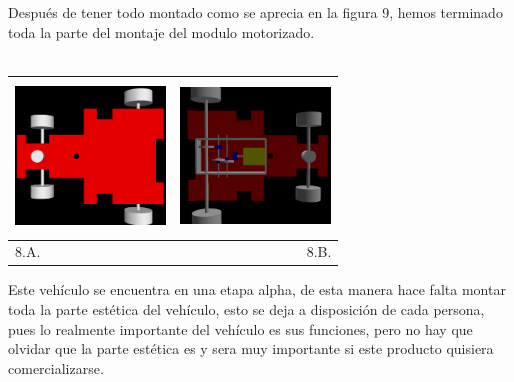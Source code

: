 \documentclass[12]{article}
\newenvironment{Figure}
{\par\medskip\noindent\minipage{\linewidth}}
{\endminipage\par\medskip}
\begin{document}
\begin{multicols}{2}
Después de tener todo montado como se aprecia en la figura 9, hemos terminado toda la parte del montaje del modulo motorizado.\\\\

\begin{Figure}	
\center
\begin{tabular}{|l|r|}
\hline
\includegraphics[width=4cm, height=4cm]{img/montaje1.png} & \includegraphics[width=4cm, height=4cm]{img/montaje2.png} \\ \hline
8.A. & 8.B. \\ \hline
\end{tabular}
\label{fig:g8}
\end{Figure}
\vspace{0.6 cm}

Este vehículo se encuentra en una etapa alpha, de esta manera hace falta montar toda la parte estética del vehículo, esto se deja a disposición de cada persona, pues lo realmente importante del vehículo es sus funciones, pero no hay que olvidar que la parte estética es y sera muy importante si este producto quisiera comercializarse.  \\\\


\end{multicols}
\end{document}

